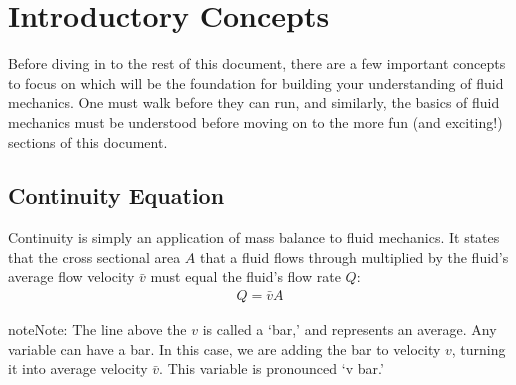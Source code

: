 \documentclass[letterpaper,10pt,english]{sphinxmanual}
\begin{document}
\section{Introductory Concepts}
\label{\detokenize{Fluids_Review/Fluids_Review_Design:introductory-concepts}}\label{\detokenize{Fluids_Review/Fluids_Review_Design:id2}}
Before diving in to the rest of this document, there are a few important concepts to focus on which will be the foundation for building your understanding of fluid mechanics. One must walk before they can run, and similarly, the basics of fluid mechanics must be understood before moving on to the more fun (and exciting!) sections of this document.


\subsection{Continuity Equation}
\label{\detokenize{Fluids_Review/Fluids_Review_Design:continuity-equation}}\label{\detokenize{Fluids_Review/Fluids_Review_Design:id3}}
Continuity is simply an application of mass balance to fluid mechanics. It states that the cross sectional area \(A\) that a fluid flows through multiplied by the fluid’s average flow velocity \(\bar v\) must equal the fluid’s flow rate \(Q\):
\begin{equation}\label{equation:Fluids_Review/Fluids_Review_Design:Fluids_Review/Fluids_Review_Design:0}
\begin{split}Q = \bar v A\end{split}
\end{equation}
\begin{sphinxadmonition}{note}{Note:}
The line above the \(v\) is called a ‘bar,’ and represents an average. Any variable can have a bar. In this case, we are adding the bar to velocity \(v\), turning it into average velocity \(\bar v\). This variable is pronounced ‘v bar.’
\end{sphinxadmonition}
\end{document}
